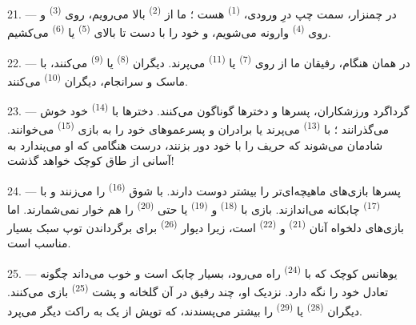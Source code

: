 21. --- در چمنزار، سمت چپ درِ ورودی، \textsuperscript{(1)} هست ؛ ما از \textsuperscript{(2)}
بالا می‌رویم، روی \textsuperscript{(3)} و روی
\textsuperscript{(4)} وارونه می‌شویم، و خود را با دست تا
بالای \textsuperscript{(5)} یا \textsuperscript{(6)} می‌کشیم.

22. --- در همان هنگام، رفیقان ما از روی \textsuperscript{(7)} یا \textsuperscript{(11)} می‌پرند. دیگران \textsuperscript{(8)}
یا \textsuperscript{(9)} می‌کنند، با ماسک و
 سرانجام، دیگران \textsuperscript{(10)}
می‌کنند.

\VUsaut{4.6mm}
\VUsaut{3.0mm}

23. --- گرداگرد ورزشکاران، پسرها و دخترها  گوناگون
می‌کنند. دخترها با \textsuperscript{(14)} خود خوش
می‌گذرانند ؛ با \textsuperscript{(13)} می‌پرند یا برادران و
پسرعموهای خود را به بازی \textsuperscript{(15)} می‌خوانند.
شادمان می‌شوند که  حریف را با  خود دور
بزنند، درست هنگامی که او می‌پندارد به آسانی از طاق کوچک خواهد گذشت!

24. --- پسرها بازی‌های ماهیچه‌ای‌تر را بیشتر دوست دارند. با شوق
\textsuperscript{(16)} را می‌زنند و با
\textsuperscript{(17)} چابکانه می‌اندازند. بازی با
\textsuperscript{(18)} و \textsuperscript{(19)}
یا حتی \textsuperscript{(20)} را هم خوار
نمی‌شمارند. اما بازی‌های دلخواه آنان \textsuperscript{(21)}
و \textsuperscript{(22)} است، زیرا دیوار
\textsuperscript{(26)} برای برگرداندن توپ سبک بسیار
مناسب است.

25. --- یوهانس کوچک که با \textsuperscript{(24)} راه
می‌رود، بسیار چابک است و خوب می‌داند چگونه تعادل خود را نگه دارد. نزدیک
او، چند رفیق در آن گلخانه و پشت  \textsuperscript{(25)}
بازی می‌کنند. دیگران \textsuperscript{(28)} یا
\textsuperscript{(29)} را بیشتر می‌پسندند، که توپش از
یک  به راکت دیگر می‌پرد.

